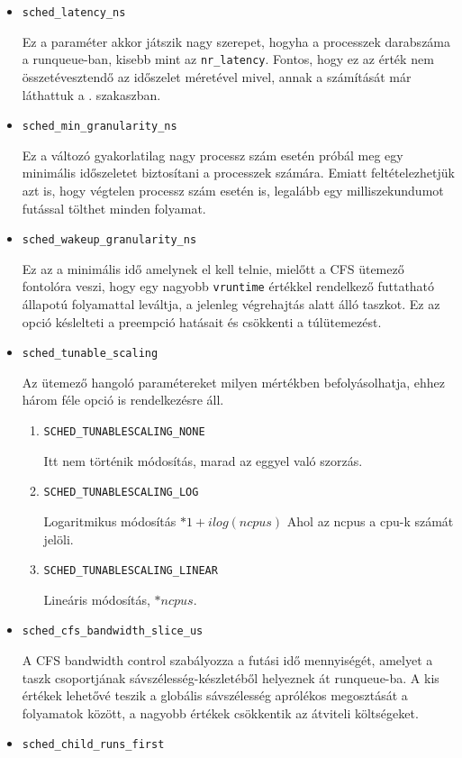 \begin{itemize}
\item \texttt{sched\_latency\_ns}

Ez a paraméter akkor játszik nagy szerepet, hogyha a processzek darabszáma a runqueue-ban, kisebb mint az \texttt{nr\_latency}. Fontos, hogy ez az érték nem összetévesztendő az időszelet méretével mivel, annak a számítását már láthattuk a . szakaszban. 

\item \texttt{sched\_min\_granularity\_ns}

Ez a változó gyakorlatilag nagy processz szám esetén próbál meg egy minimális időszeletet biztosítani a processzek számára. Emiatt feltételezhetjük azt is, hogy végtelen processz szám esetén is, legalább egy milliszekundumot futással tölthet minden folyamat.

\item \texttt{sched\_wakeup\_granularity\_ns}

Ez az a minimális idő amelynek el kell telnie, mielőtt a CFS ütemező fontolóra veszi, hogy egy nagyobb \texttt{vruntime} értékkel rendelkező futtatható állapotú folyamattal leváltja, a jelenleg végrehajtás alatt álló taszkot.
Ez az opció késlelteti a preempció hatásait és csökkenti a túlütemezést. 

\item \texttt{sched\_tunable\_scaling}

Az ütemező hangoló paramétereket milyen mértékben befolyásolhatja, ehhez három féle opció is rendelkezésre áll.
\begin{enumerate}
\item \texttt{SCHED\_TUNABLESCALING\_NONE}

Itt nem történik módosítás, marad az eggyel való szorzás.
\item \texttt{SCHED\_TUNABLESCALING\_LOG}

Logaritmikus módosítás $*1+ilog(ncpus)$
Ahol az ncpus a cpu-k számát jelöli.

\item \texttt{SCHED\_TUNABLESCALING\_LINEAR}

Lineáris módosítás, $*ncpus$. 
\end{enumerate}

\item \texttt{sched\_cfs\_bandwidth\_slice\_us}

A CFS bandwidth control szabályozza a futási idő mennyiségét, amelyet a taszk csoportjának sávszélesség-készletéből helyeznek át runqueue-ba. A kis értékek lehetővé teszik a globális sávszélesség aprólékos megosztását a folyamatok között, a nagyobb értékek csökkentik az átviteli költségeket.
\item \texttt{sched\_child\_runs\_first}


\end{itemize}
